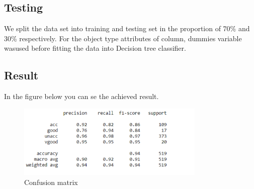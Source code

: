 \documentclass[a4paper, 12pt]{article}
\begin{document}
\subsection{Testing}
We split the data set into training and testing set in the proportion of 70\% and 30\% respectively. For the object type attributes of column, dummies variable wasused before fitting the data into Decision tree classifier.

\subsection{Result}
In the figure below you can se the achieved result.


  \begin{figure}[h]
    \centering 
    \includegraphics[width=0.8\textwidth]
    {images/confusion}
    \caption{Confusion matrix}
    \label{conf}
  \end{figure}
\end{document}
